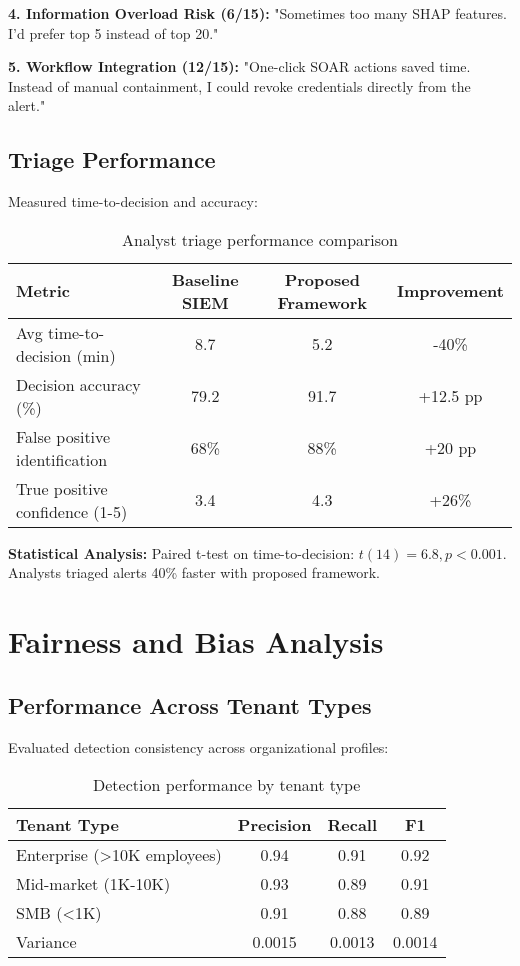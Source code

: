 \textbf{4. Information Overload Risk (6/15):}
"Sometimes too many SHAP features. I'd prefer top 5 instead of top 20."

\textbf{5. Workflow Integration (12/15):}
"One-click SOAR actions saved time. Instead of manual containment, I could revoke credentials directly from the alert."

\subsection{Triage Performance}
Measured time-to-decision and accuracy:

\begin{table}[H]
\centering
\caption{Analyst triage performance comparison}
\label{tab:triage-performance}
\begin{tabular}{lccc}
\toprule
\textbf{Metric} & \textbf{Baseline SIEM} & \textbf{Proposed Framework} & \textbf{Improvement} \\
\midrule
Avg time-to-decision (min) & 8.7 & 5.2 & -40\% \\
Decision accuracy (\%) & 79.2 & 91.7 & +12.5 pp \\
False positive identification & 68\% & 88\% & +20 pp \\
True positive confidence (1-5) & 3.4 & 4.3 & +26\% \\
\bottomrule
\end{tabular}
\end{table}

\textbf{Statistical Analysis:} Paired t-test on time-to-decision: $t(14) = 6.8, p < 0.001$. Analysts triaged alerts 40\% faster with proposed framework.

\section{Fairness and Bias Analysis}\label{sec:eval-fairness}
\subsection{Performance Across Tenant Types}
Evaluated detection consistency across organizational profiles:

\begin{table}[H]
\centering
\caption{Detection performance by tenant type}
\label{tab:fairness-tenant}
\begin{tabular}{lccc}
\toprule
\textbf{Tenant Type} & \textbf{Precision} & \textbf{Recall} & \textbf{F1} \\
\midrule
Enterprise (>10K employees) & 0.94 & 0.91 & 0.92 \\
Mid-market (1K-10K) & 0.93 & 0.89 & 0.91 \\
SMB (<1K) & 0.91 & 0.88 & 0.89 \\
\midrule
Variance & 0.0015 & 0.0013 & 0.0014 \\
\bottomrule
\end{tabular}
\end{table}

